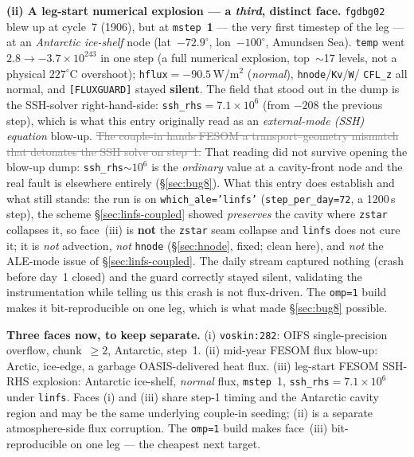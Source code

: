 \documentclass[11pt,a4paper]{article}
\newcommand{\code}[1]{\texttt{\small #1}}
\newcommand{\dead}[1]{\textcolor{gray}{\sout{#1}}}
\begin{document}
\textbf{(ii) A leg-start numerical explosion --- a \emph{third}, distinct face.} \code{fgdbg02} blew up
at cycle~7 (1906), but at \code{mstep}~\textbf{1} --- the very first timestep of the leg --- at an
\emph{Antarctic ice-shelf} node (lat~$-72.9^\circ$, lon~$-100^\circ$, Amundsen Sea). \code{temp} went
$2.8\to-3.7\times10^{243}$ in one step (a full numerical explosion, top~$\sim$17 levels, not a physical
$227^\circ$C overshoot); \code{hflux}$=-90.5$\,W/m$^2$ (\emph{normal}), \code{hnode}/\code{Kv}/\code{W}/
\code{CFL\_z} all normal, and \code{[FLUXGUARD]} stayed \textbf{silent}. The field that stood out in the
dump is the SSH-solver right-hand-side: \code{ssh\_rhs}$=7.1\times10^{6}$ (from $-208$ the previous
step), which is what this entry originally read as an \emph{external-mode (SSH) equation} blow-up.
\dead{The couple-in hands FESOM a transport--geometry mismatch that detonates the SSH solve on step~1.}
That reading did not survive opening the blow-up dump: \code{ssh\_rhs}$\sim10^{6}$ is the \emph{ordinary}
value at a cavity-front node and the real fault is elsewhere entirely (\S\ref{sec:bug8}). What this
entry does establish and what still stands: the run is on \code{which\_ale='linfs'}
(\code{step\_per\_day=72}, a 1200\,s step), the scheme \S\ref{sec:linfs-coupled} showed \emph{preserves}
the cavity where \code{zstar} collapses it, so face~(iii) is \textbf{not} the \code{zstar} seam collapse
and \code{linfs} does not cure it; it is \emph{not} advection, \emph{not} \code{hnode}
(\S\ref{sec:hnode}, fixed; clean here), and \emph{not} the ALE-mode issue of \S\ref{sec:linfs-coupled}.
The daily stream captured nothing (crash before day~1 closed) and the guard correctly stayed silent,
validating the instrumentation while telling us this crash is not flux-driven. The
\code{omp=1} build makes it bit-reproducible on one leg, which is what made \S\ref{sec:bug8} possible.

\textbf{Three faces now, to keep separate.} (i) \code{voskin:282}: OIFS single-precision overflow,
chunk~$\ge2$, Antarctic, step~1. (ii) mid-year FESOM flux blow-up: Arctic, ice-edge, a garbage
OASIS-delivered heat flux. (iii) leg-start FESOM SSH-RHS explosion: Antarctic ice-shelf, \emph{normal}
flux, \code{mstep}~1, \code{ssh\_rhs}$=7.1\times10^{6}$ under \code{linfs}. Faces (i) and (iii) share
step-1 timing and the Antarctic cavity region and may be the same underlying couple-in seeding; (ii) is
a separate atmosphere-side flux corruption. The \code{omp=1} build makes face~(iii) bit-reproducible on
one leg --- the cheapest next target.
\end{document}
